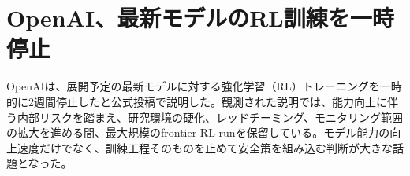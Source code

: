 \section{OpenAI、最新モデルのRL訓練を一時停止}
OpenAIは、展開予定の最新モデルに対する強化学習（RL）トレーニングを一時的に2週間停止したと公式投稿で説明した。観測された説明では、能力向上に伴う内部リスクを踏まえ、研究環境の硬化、レッドチーミング、モニタリング範囲の拡大を進める間、最大規模のfrontier RL runを保留している。モデル能力の向上速度だけでなく、訓練工程そのものを止めて安全策を組み込む判断が大きな話題となった。

